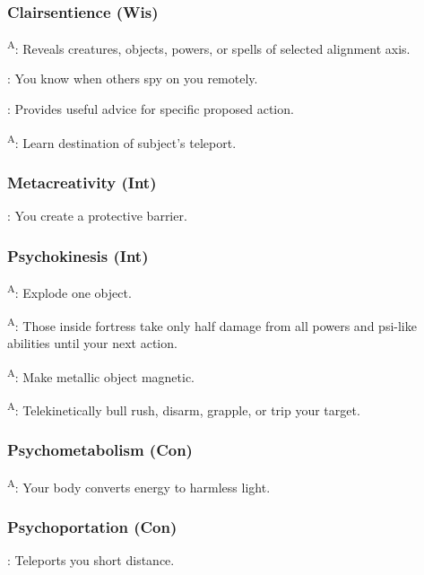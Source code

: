 \subsubsection{Clairsentience (Wis)}

\textsuperscript{A}: Reveals creatures, objects, powers, or spells of selected alignment axis.

: You know when others spy on you remotely.

: Provides useful advice for specific proposed action.

\textsuperscript{A}: Learn destination of subject's teleport.


\subsubsection{Metacreativity (Int)}

: You create a protective barrier.


\subsubsection{Psychokinesis (Int)}

\textsuperscript{A}: Explode one object.

\textsuperscript{A}: Those inside fortress take only half damage from all powers and psi-like abilities until your next action.

\textsuperscript{A}: Make metallic object magnetic.

\textsuperscript{A}: Telekinetically bull rush, disarm, grapple, or trip your target.


\subsubsection{Psychometabolism (Con)}

\textsuperscript{A}: Your body converts energy to harmless light.


\subsubsection{Psychoportation (Con)}

: Teleports you short distance.

